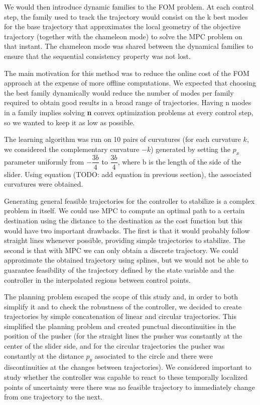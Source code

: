 \documentclass[12,twoside]{TFG-GM}
\theoremstyle{definition}
\theoremstyle{remark}
\begin{document}
We would then introduce dynamic families to the FOM problem. At each control step, the family used to track the trajectory would consist on the k best modes for the base trajectory that approximates the local geometry of the objective trajectory (together with the chameleon mode) to solve the MPC problem on that instant. The chameleon mode was shared between the dynamical families to ensure that the sequential consistency property was not lost.

The main motivation for this method was to reduce the online cost of the FOM approach at the expense of more offline computations. We expected that choosing the best family dynamically would reduce the number of modes per family required to obtain good results in a broad range of trajectories. Having n modes in a family implies solving \textbf{n} convex optimization problems at every control step, so we wanted to keep it as low as possible.

The learning algorithm was run on 10 pairs of curvatures (for each curvature $k$, we considered the complementary curvature $-k$) generated by setting the $p_x$ parameter uniformly from $-\dfrac{3b}{4}$ to  $\dfrac{3b}{4}$, where b is the length of the side of the slider. Using equation (TODO: add equation in previous section), the associated curvatures were obtained.

Generating general feasible trajectories for the controller to stabilize is a complex problem in itself. We could use MPC to compute an optimal path to a certain destination using the distance to the destination as the cost function but this would have two important drawbacks. The first is that it would probably follow straight lines whenever possible, providing simple trajectories to stabilize. The second is that with MPC we can only obtain a discrete trajectory. We could approximate the obtained trajectory using splines, but we would not be able to guarantee feasibility of the trajectory defined by the state variable and the controller in the interpolated regions between control points.

The planning problem escaped the scope of this study and, in order to both simplify it and to check the robustness of the controller, we decided to create trajectories by simple concatenation of linear and circular trajectories. This simplified the planning problem and created punctual discontinuities in the position of the pusher (for the straight lines the pusher was constantly at the center of the slider side, and for the circular trajectories the pusher was constantly at the distance $p_y$ associated to the circle and there were discontinuities at the changes between trajectories). We considered important to study whether the controller was capable to react to these temporally localized points of uncertainty were there was no feasible trajectory to immediately change from one trajectory to the next.
\end{document}
